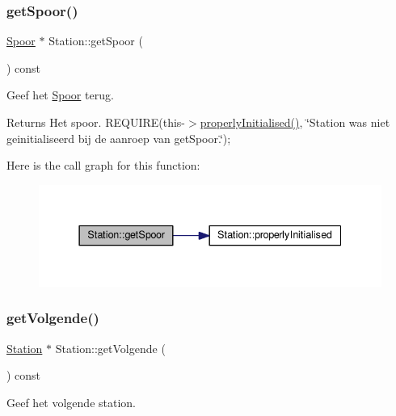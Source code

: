 \subsubsection{\texorpdfstring{get\+Spoor()}{getSpoor()}}
{\footnotesize\ttfamily \hyperlink{class_spoor}{Spoor} $\ast$ Station\+::get\+Spoor (\begin{DoxyParamCaption}{ }\end{DoxyParamCaption}) const}



Geef het \hyperlink{class_spoor}{Spoor} terug. 

\begin{DoxyReturn}{Returns}
Het spoor. R\+E\+Q\+U\+I\+RE(this-\/$>$\hyperlink{class_station_a9ce626dd0599e3ea8107404a59c21e16}{properly\+Initialised()}, \char`\"{}\+Station was niet geinitialiseerd bij de aanroep van get\+Spoor.\char`\"{});~\newline

\end{DoxyReturn}
Here is the call graph for this function\+:
\nopagebreak
\begin{figure}[H]
\begin{center}
\leavevmode
\includegraphics[width=337pt]{class_station_a5230690094cdfd1e9f443d76f35c8a19_cgraph}
\end{center}
\end{figure}
\mbox{\label{class_station_a330c297adddcbfd5d8871075291e9512}} 
\subsubsection{\texorpdfstring{get\+Volgende()}{getVolgende()}}
{\footnotesize\ttfamily \hyperlink{class_station}{Station} $\ast$ Station\+::get\+Volgende (\begin{DoxyParamCaption}{ }\end{DoxyParamCaption}) const}



Geef het volgende station. 

